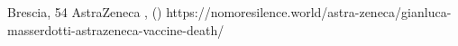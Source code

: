           {Brescia, }
          {54}
          {AstraZeneca}
          {}
          {
            ,
             ()
          }
          {https://nomoresilence.world/astra-zeneca/gianluca-masserdotti-astrazeneca-vaccine-death/}
